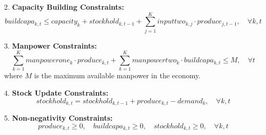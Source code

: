 \documentclass{article}
\begin{document}
2. \textbf{Capacity Building Constraints:}\\
\[
buildcapa_{k, t} \leq capacity_{k} + stockhold_{k, t-1} + \sum_{j=1}^{K} inputtwo_{k, j} \cdot produce_{j, t-1}, \quad \forall k, t
\]

3. \textbf{Manpower Constraints:}\\
\[
\sum_{k=1}^{K} manpowerone_{k} \cdot produce_{k, t} + \sum_{k=1}^{K} manpowertwo_{k} \cdot buildcapa_{k, t} \leq M, \quad \forall t
\]
where \(M\) is the maximum available manpower in the economy.

4. \textbf{Stock Update Constraints:}\\
\[
stockhold_{k, t} = stockhold_{k, t-1} + produce_{k, t} - demand_{k}, \quad \forall k, t
\]

5. \textbf{Non-negativity Constraints:}\\
\[
produce_{k, t} \geq 0, \quad buildcapa_{k, t} \geq 0, \quad stockhold_{k, t} \geq 0, \quad \forall k, t
\]
\end{document}
